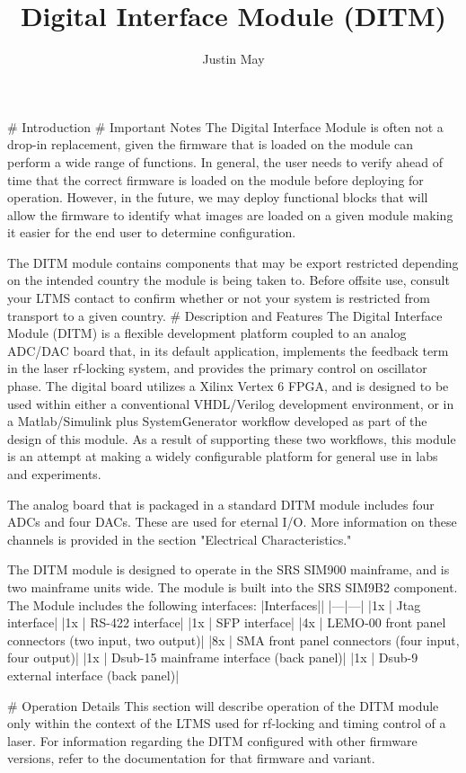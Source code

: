 \documentclass{article}
\begin{document}
\title{Digital Interface Module (DITM)}
\author{Justin May}
# Introduction
# Important Notes
The Digital Interface Module is often not a drop-in replacement, given the firmware that is loaded on the module can perform a wide range of functions. In general, the user needs to verify ahead of time that the correct firmware is loaded on the module before deploying for operation. However, in the future, we may deploy functional blocks that will allow the firmware to identify what images are loaded on a given module making it easier for the end user to determine configuration.

The DITM module contains components that may be export restricted depending on the intended country the module is being taken to. Before offsite use, consult your LTMS contact to confirm whether or not your system is restricted from transport to a given country.
# Description and Features
The Digital Interface Module (DITM) is a flexible development platform coupled to an analog ADC/DAC board that, in its default application, implements the feedback term in the laser rf-locking system, and provides the primary control on oscillator phase. The digital board utilizes a Xilinx Vertex 6 FPGA, and is designed to be used within either a conventional VHDL/Verilog development environment, or in a Matlab/Simulink plus SystemGenerator workflow developed as part of the design of this module. As a result of supporting these two workflows, this module is an attempt at making a widely configurable platform for general use in labs and experiments.

The analog board that is packaged in a standard DITM module includes four ADCs and four DACs. These are used for eternal I/O. More information on these channels is provided in the section "Electrical Characteristics."

The DITM module is designed to operate in the SRS SIM900 mainframe, and is two mainframe units wide. The module is built into the SRS SIM9B2 component. The Module includes the following interfaces:
|Interfaces||
|---|---|
|1x | Jtag interface|
|1x | RS-422 interface|
|1x | SFP interface|
|4x | LEMO-00 front panel connectors (two input, two output)|
|8x | SMA front panel connectors (four input, four output)|
|1x | Dsub-15 mainframe interface (back panel)|
|1x | Dsub-9 external interface (back panel)|

# Operation Details
This section will describe operation of the DITM module only within the context of the LTMS used for rf-locking and timing control of a laser. For information regarding the DITM configured with other firmware versions, refer to the documentation for that firmware and variant.
\end{document}
